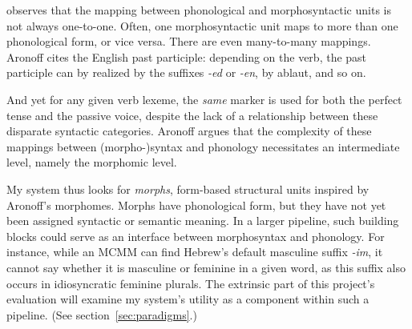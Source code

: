 


\cite{aronoff:1994} observes that the mapping 
between phonological and
morphosyntactic units is not always one-to-one. Often, one
morphosyntactic unit maps to more than one phonological form, or
vice versa. There are even many-to-many mappings. Aronoff cites
the English past participle: depending on the verb, the past
participle can by realized by the suffixes \textit{-ed} or
\textit{-en}, by ablaut, and so on. 

And yet for any given verb lexeme, the \emph{same} marker is used
for both the perfect tense and the passive voice, despite the lack of a
relationship between these disparate syntactic categories.
Aronoff argues that the complexity of these mappings between
(morpho-)syntax and phonology necessitates an intermediate level, namely the
morphomic level.

My system thus looks for \emph{morphs}, form-based structural units
inspired by Aronoff's morphomes.
Morphs have phonological form, but they have not yet been assigned syntactic or semantic meaning. 
In a larger pipeline, such 
building blocks could serve as an interface between morphosyntax 
and phonology. For instance, while an MCMM can find Hebrew's default 
masculine suffix \textit{-im}, it cannot say whether it is
masculine or feminine in a given word, as this suffix
also occurs in idiosyncratic feminine plurals. The extrinsic part of this project's
 evaluation will examine my system's utility as a component within such a pipeline.
(See section~\ref{sec:paradigms}.)

